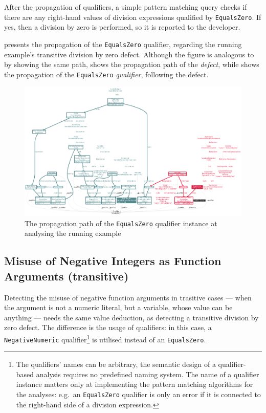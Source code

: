 After the propagation of qualifiers, a simple pattern matching query checks if there are any right-hand values of division expressions qualified by \lstinline{EqualsZero}. If yes, then a division by zero is performed, so it is reported to the developer.

 presents the propagation of the \lstinline{EqualsZero} qualifier, regarding the running example's transitive division by zero defect. Although the figure is analogous to  by showing the same path,  shows the propagation path of the \emph{defect}, while  shows the propagation of the \lstinline{EqualsZero} \emph{qualifier}, following the defect.

\begin{figure}
  \centering
	\includegraphics[width=\textwidth, trim=12mm 12mm 12mm 12mm,clip]{figures/analysis_divisionByZero_transitive.pdf}
  \caption{The propagation path of the \lstinline{EqualsZero} qualifier instance at analysing the running example}
  \label{fig:divisionbyzero-transitive}
\end{figure}


\subsection{Misuse of Negative Integers as Function Arguments (transitive)}

Detecting the misuse of negative function arguments in trasitive cases — when the argument is not a numeric literal, but a variable, whose value can be anything — needs the same value deduction, as detecting a transitive division by zero defect. The difference is the usage of qualifiers: in this case, a \lstinline{NegativeNumeric} qualifier\footnote{The qualifiers' names can be arbitrary, the semantic design of a qualifier-based analysis requires no predefined naming system. The name of a qualifier instance matters only at implementing the pattern matching algorithms for the analyses: e.g.\ an \lstinline{EqualsZero} qualifier is only an error if it is connected to the right-hand side of a division expression.} is utilised instead of an \lstinline{EqualsZero}.

